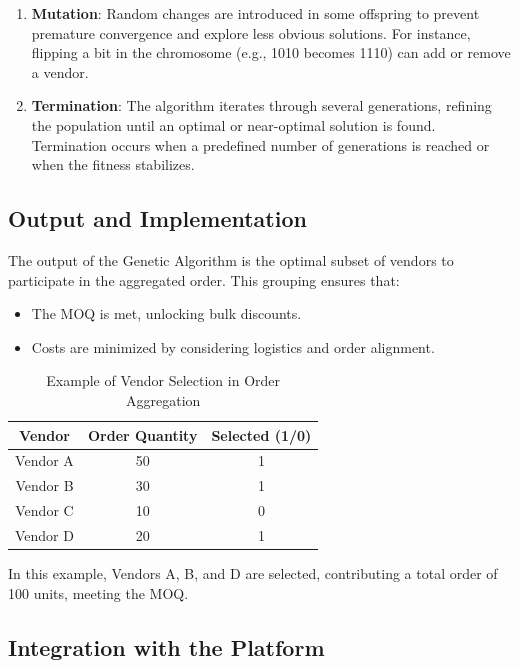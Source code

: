 \begin{enumerate}
    \item \textbf{Mutation}: Random changes are introduced in some offspring to prevent premature convergence and explore less obvious solutions. For instance, flipping a bit in the chromosome (e.g., 1010 becomes 1110) can add or remove a vendor.
    
    \item \textbf{Termination}: The algorithm iterates through several generations, refining the population until an optimal or near-optimal solution is found. Termination occurs when a predefined number of generations is reached or when the fitness stabilizes.
\end{enumerate}

\subsection{Output and Implementation}

The output of the Genetic Algorithm is the optimal subset of vendors to participate in the aggregated order. This grouping ensures that:

\begin{itemize}
    \item The MOQ is met, unlocking bulk discounts.
    \item Costs are minimized by considering logistics and order alignment.
\end{itemize}

\begin{table}[h!]
\centering
\begin{tabular}{|c|c|c|}
\hline
\textbf{Vendor} & \textbf{Order Quantity} & \textbf{Selected (1/0)} \\
\hline
Vendor A & 50 & 1 \\
Vendor B & 30 & 1 \\
Vendor C & 10 & 0 \\
Vendor D & 20 & 1 \\
\hline
\end{tabular}
\caption{Example of Vendor Selection in Order Aggregation}
\end{table}

In this example, Vendors A, B, and D are selected, contributing a total order of 100 units, meeting the MOQ.

\subsection{Integration with the Platform}

